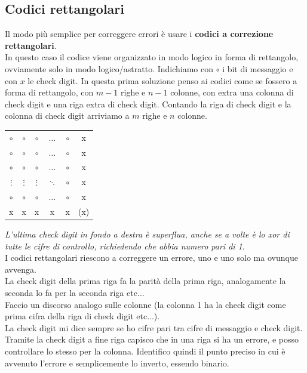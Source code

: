 \documentclass[a4paper,12pt, oneside]{book}
\begin{document}
\subsection{Codici rettangolari}
Il modo più semplice per correggere errori è usare i \textbf{codici a correzione
  rettangolari}. \\
In questo caso il codice viene organizzato in modo logico in forma di
rettangolo, ovviamente solo in modo logico/astratto.
Indichiamo con $\circ$ i bit di messaggio e con $x$ le check digit. In questa
prima soluzione penso ai codici come se fossero a forma di rettangolo, con $m-1$
righe e $n-1$ colonne, con extra una colonna di check digit e una riga extra di
check digit. Contando la riga di check digit e la colonna di check digit
arriviamo a $m$ righe e $n$ colonne.
\begin{table}[H]
  \centering
  \begin{tabular}{cccccc}
    $\circ$ & $\circ$ & $\circ$ &$\ldots$ & $\circ$ & x\\
    $\circ$ & $\circ$ & $\circ$ &$\ldots$ & $\circ$ & x\\
    $\circ$ & $\circ$ & $\circ$ &$\ldots$ & $\circ$ & x\\
    $\vdots$ & $\vdots$ & $\vdots$ &$\ddots$ & $\circ$ & x\\
    $\circ$ & $\circ$ & $\circ$ &$\ldots$ & $\circ$ & x\\
    x&x&x&x&x&(x)
  \end{tabular}
\end{table}
\textit{L'ultima check digit in fondo a destra è superflua, anche se a volte è
  lo xor di tutte le cifre di controllo, richiedendo che abbia numero pari di
  1}.\\ 
I codici rettangolari riescono a correggere un errore, uno e uno solo ma ovunque
avvenga.\\
La check digit della prima riga fa la parità della prima riga, analogamente la
seconda lo fa per la seconda riga etc$\ldots$\\
Faccio un discorso analogo sulle colonne (la colonna 1 ha la check digit come
prima cifra della riga di check digit etc$\ldots$).\\
La check digit mi dice sempre se ho cifre pari tra cifre di messaggio e check
digit.\\ 
Tramite la check digit a fine riga capisco che in una riga si ha un errore, e
posso controllare lo stesso per la colonna. Identifico quindi il punto preciso
in cui è avvenuto l'errore e semplicemente lo inverto, essendo binario.\\
\end{document}
